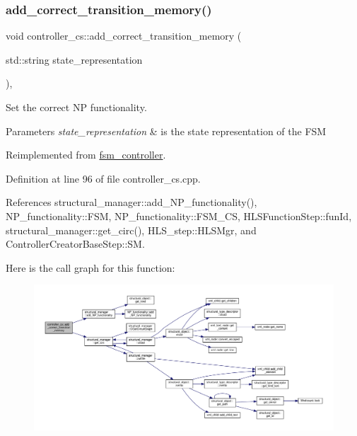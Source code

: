 \subsubsection{\texorpdfstring{add\+\_\+correct\+\_\+transition\+\_\+memory()}{add\_correct\_transition\_memory()}}
{\footnotesize\ttfamily void controller\+\_\+cs\+::add\+\_\+correct\+\_\+transition\+\_\+memory (\begin{DoxyParamCaption}\item[{std\+::string}]{state\+\_\+representation }\end{DoxyParamCaption})\hspace{0.3cm}{\ttfamily [protected]}, {\ttfamily [virtual]}}



Set the correct NP functionality. 


\begin{DoxyParams}{Parameters}
{\em state\+\_\+representation} & is the state representation of the F\+SM \\
\hline
\end{DoxyParams}


Reimplemented from \hyperlink{classfsm__controller_a80e22f1c0437e36734f4339828e44e68}{fsm\+\_\+controller}.



Definition at line 96 of file controller\+\_\+cs.\+cpp.



References structural\+\_\+manager\+::add\+\_\+\+N\+P\+\_\+functionality(), N\+P\+\_\+functionality\+::\+F\+SM, N\+P\+\_\+functionality\+::\+F\+S\+M\+\_\+\+CS, H\+L\+S\+Function\+Step\+::fun\+Id, structural\+\_\+manager\+::get\+\_\+circ(), H\+L\+S\+\_\+step\+::\+H\+L\+S\+Mgr, and Controller\+Creator\+Base\+Step\+::\+SM.

Here is the call graph for this function\+:
\nopagebreak
\begin{figure}[H]
\begin{center}
\leavevmode
\includegraphics[width=350pt]{d9/dfb/classcontroller__cs_a4edfec7623dd2b6abd2be4a994fb19e2_cgraph}
\end{center}
\end{figure}
\mbox{\label{classcontroller__cs_a2230a944eb2a06a9565aeec5c86c68e1}} 
